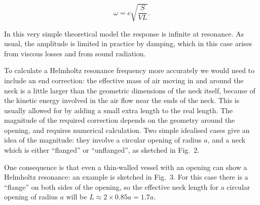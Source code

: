   $$\omega = c \sqrt{\frac{S}{VL}} .\tag{8}$$ 

  In this very simple theoretical model the response is infinite at resonance. 
  As usual, the amplitude is limited in practice by damping, which in this case 
  arises from viscous losses and from sound radiation. 

  To calculate a Helmholtz resonance frequency more accurately we would need to 
  include an end correction: the effective mass of air moving in and around the 
  neck is a little larger than the geometric dimensions of the neck itself, 
  because of the kinetic energy involved in the air flow near the ends of the 
  neck. This is usually allowed for by adding a small extra length to the real 
  length. The magnitude of the required correction depends on the geometry 
  around the opening, and requires numerical calculation. Two simple idealised 
  cases give an idea of the magnitude: they involve a circular opening of 
  radius $a$, and a neck which is either ``flanged'' or ``unflanged'', as 
  sketched in Fig.\ 2. 


  One consequence is that even a thin-walled vessel with an opening can show a 
  Helmholtz resonance: an example is sketched in Fig.\ 3. For this case there 
  is a ``flange'' on both sides of the opening, so the effective neck length 
  for a circular opening of radius $a$ will be $L \approx 2 \times 0.85 a=1.7 
  a$. 

